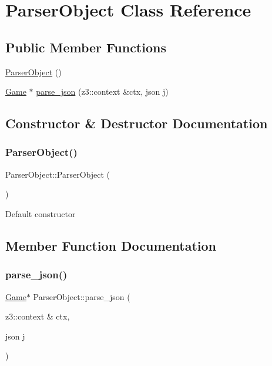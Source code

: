 \hypertarget{classParserObject}{}\section{Parser\+Object Class Reference}
\label{classParserObject}
\subsection*{Public Member Functions}
\begin{DoxyCompactItemize}
\item 
\hyperlink{classParserObject_acc81aa99c0d4e10fb2453aee333b115a}{Parser\+Object} ()
\item 
\hyperlink{classGame}{Game} $\ast$ \hyperlink{classParserObject_af964d36a89d238976ed3df5669f32d06}{parse\+\_\+json} (z3\+::context \&ctx, json j)
\end{DoxyCompactItemize}


\subsection{Constructor \& Destructor Documentation}
\mbox{\label{classParserObject_acc81aa99c0d4e10fb2453aee333b115a}} 
\subsubsection{\texorpdfstring{Parser\+Object()}{ParserObject()}}
{\footnotesize\ttfamily Parser\+Object\+::\+Parser\+Object (\begin{DoxyParamCaption}{ }\end{DoxyParamCaption})\hspace{0.3cm}{\ttfamily [inline]}}

Default constructor 

\subsection{Member Function Documentation}
\mbox{\label{classParserObject_af964d36a89d238976ed3df5669f32d06}} 
\subsubsection{\texorpdfstring{parse\+\_\+json()}{parse\_json()}}
{\footnotesize\ttfamily \hyperlink{classGame}{Game}$\ast$ Parser\+Object\+::parse\+\_\+json (\begin{DoxyParamCaption}\item[{z3\+::context \&}]{ctx,  }\item[{json}]{j }\end{DoxyParamCaption})\hspace{0.3cm}{\ttfamily [inline]}}

